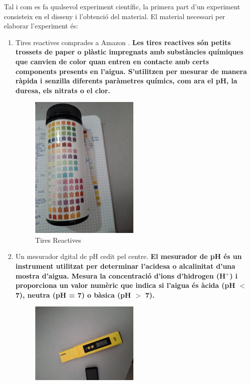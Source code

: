 Tal i com es fa qualsevol experiment científic, la primera part d'un experiment consisteix en el disseny i l'obtenció del material. El material necessari per elaborar l'experiment és:
\begin{enumerate}
 \item Tires reactives comprades a Amazon \cite{tiresReactives}. \textbf{Les tires reactives són petits trossets de paper o plàstic impregnats amb substàncies químiques que canvien de color quan entren en contacte amb certs components presents en l’aigua. S’utilitzen per mesurar de manera ràpida i senzilla diferents paràmetres químics, com ara el pH, la duresa, els nitrats o el clor.}
 \begin{figure}[h!]
\centering
\includegraphics[width=0.5\textwidth, angle=270]{./Figures/TIres.png}
\caption{Tires Reactives}
\label{fig:TiresReactives}
\end{figure}
 \item Un mesurador dgital de pH cedit pel centre.  \textbf{El mesurador de pH és un instrument utilitzat per determinar l’acidesa o alcalinitat d’una mostra d’aigua. Mesura la concentració d’ions d’hidrogen (H$^+$) i proporciona un valor numèric que indica si l’aigua és àcida (pH $<$ 7), neutra (pH = 7) o bàsica (pH $>$ 7).}
 \begin{figure}[h!]
\centering
\includegraphics[width=0.5\textwidth]{./Figures/mesurador.png}

\end{figure}
\end{enumerate}
